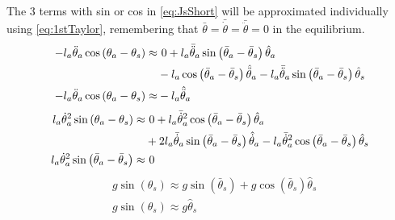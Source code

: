 The 3 terms with sin or cos in \autoref{eq:JsShort} will be approximated individually using \autoref{eq:1stTaylor}, remembering that $\bar{\theta}=\bar{\dot{\theta}}=\bar{\ddot{\theta}}=0$ in the equilibrium.
\begin{subequations}
	\begin{flalign}
		-l_a\ddot{\theta}_a\cos\left(\theta_a-\theta_s\right)  \approx & \ 0 + l_a\bar{\ddot{\theta}}_a\sin\left(\bar{\theta}_a-\bar{\theta}_s\right)\hat{\theta}_a  \notag \\ 
		& -l_a\cos\left(\bar{\theta}_a-\bar{\theta}_s\right)\hat{\ddot{\theta}}_a - l_a\bar{\ddot{\theta}}_a\sin\left(\bar{\theta}_a-\bar{\theta}_s\right)\hat{\theta}_s   \\
		-l_a\ddot{\theta}_a\cos\left(\theta_a-\theta_s\right) \approx &-l_a\hat{\ddot{\theta}}_a 
	\end{flalign} %
\end{subequations}
\begin{subequations}
	\begin{flalign}
		l_a\dot{\theta}_a^2\sin\left(\theta_a-\theta_s\right)  \approx &\ 0 + l_a\bar{\dot{\theta}}_a^2\cos\left(\bar{\theta}_a-\bar{\theta}_s\right)\hat{\theta}_a  \notag \\
		& + 2l_a\bar{\dot{\theta}}_a\sin\left(\bar{\theta}_a-\bar{\theta}_s\right)\hat{\dot{\theta}}_a-l_a\bar{\dot{\theta}}_a^2\cos\left(\bar{\theta}_a-\bar{\theta}_s\right)\hat{\theta}_s   \\
		l_a\dot{\theta}_a^2\sin\left(\bar{\theta}_a-\bar{\theta}_s\right) \approx & \ 0 
	\end{flalign}
\end{subequations}
\begin{subequations}
	\begin{flalign}
		& g\sin\left(\theta_s\right) \approx g\sin\left(\bar{\theta}_s\right) +g\cos\left(\bar{\theta}_s\right)\hat{\theta}_s \\
		& g\sin\left(\theta_s\right) \approx g\hat{\theta}_s 
	\end{flalign}
\end{subequations}


